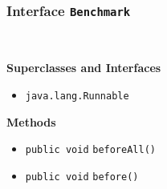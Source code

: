 \subsubsection{Interface \lstinline|Benchmark|}
 \\
\noindent\begin{minipage}[t]{5cm}
\vspace{0.3em}
\hspace*{2em}
\vspace{0.3em}
\end{minipage}



\textbf{\sffamily Superclasses and Interfaces}
\begin{itemize}
\item \lstinline|java.lang.Runnable|
\end{itemize}



\textbf{\sffamily Methods}
\begin{itemize}
\item \lstinline|public void| \lstinline|beforeAll|\lstinline|()| \\[-0.6em]




\item \lstinline|public void| \lstinline|before|\lstinline|()| \\[-0.6em]




\end{itemize}


